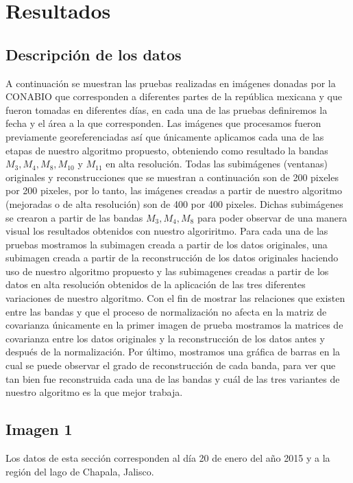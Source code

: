 \chapter{Resultados}

\section{Descripción de los datos}

A continuación se muestran las pruebas realizadas en imágenes donadas por la CONABIO que corresponden a diferentes partes de la república mexicana y que fueron tomadas en diferentes días, en cada una de las pruebas definiremos la fecha y el área a la que corresponden. Las imágenes que procesamos fueron previamente georeferenciadas así que únicamente aplicamos cada una de las etapas de nuestro algoritmo propuesto, obteniendo como resultado la bandas $M_{3}, M_{4}, M_{8}, M_{10}$ y  $M_{11}$ en alta resolución. Todas las subimágenes (ventanas) originales y reconstrucciones que se muestran a continuación son de 200 pixeles por 200 pixeles, por lo tanto, las imágenes creadas a partir de nuestro algoritmo (mejoradas o de alta resolución) son de 400 por 400 pixeles. Dichas subimágenes se crearon a partir de las bandas $M_{3}, M_{4}, M_{8}$ para poder observar de una manera visual los resultados obtenidos con nuestro algoriritmo. Para cada una de las pruebas mostramos la subimagen creada a partir de los datos originales, una subimagen creada a partir de la reconstrucción de los datos originales haciendo uso de nuestro algoritmo propuesto y las subimagenes creadas a partir de los datos en alta resolución obtenidos de la aplicación de las tres diferentes variaciones de nuestro algoritmo. Con el fin de mostrar las relaciones que existen entre las bandas y que el proceso de normalización no afecta en la matriz de covarianza únicamente en la primer imagen de prueba mostramos la matrices de covarianza entre los datos originales y la reconstrucción de los datos antes y después de la normalización. Por último, mostramos una gráfica de barras en la cual se puede observar el grado de reconstrucción de cada banda, para ver que tan bien fue reconstruida cada una de las bandas y cuál de las tres variantes de nuestro algoritmo es la que mejor trabaja.


\section{Imagen 1}

Los datos de esta sección corresponden al día 20 de enero del año 2015 y a la región del lago de Chapala, Jalisco. 

